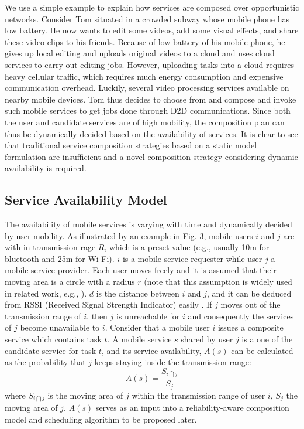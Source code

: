 \documentclass[journal]{IEEEtran}
\begin{document}
We use a simple example to explain how services are composed over opportunistic networks.
Consider Tom situated in a crowded subway whose mobile phone has low battery. 
He now wants to edit some videos, add some visual effects, and share these video clips to his friends.
Because of low battery of his mobile phone, he gives up local editing and uploads original videos to a cloud and uses cloud services to carry out editing jobs. However, uploading tasks into a cloud requires heavy cellular traffic, which requires much energy consumption and expensive communication overhead.
Luckily, several video processing services available on nearby mobile devices. Tom thus decides to choose from and compose and invoke such mobile services to get jobs done through D2D communications. 
Since both the user and candidate services are of high mobility, the composition plan can thus be dynamically decided based on the availability of services.  It is clear to see that traditional service composition strategies based on a static model formulation are insufficient and a novel composition strategy considering dynamic availability is required.

\subsection{Service Availability Model}

The availability of mobile services is varying with time and dynamically decided by user mobility. 
As illustrated by an example in Fig. 3, mobile users $i$ and $j$ are with in transmission rage $R$, which is a preset value (e.g., usually 10m for bluetooth and 25m for Wi-Fi). $i$ is a mobile service requester while user $j$ a mobile service provider. Each user moves freely and it is assumed that their moving area is a circle with a radius $r$ (note that this assumption is widely used in related work, e.g., \cite{Yang2010, Deng2017, wu2001personal}). $d$ is the distance between $i$ and $j$, and it can be deduced from RSSI (Received Signal Strength Indicator) easily \cite{benkic2008using}. If $j$ moves out of the transmission range of $i$, then $j$ is unreachable for $i$ and consequently the services of $j$ become unavailable to $i$.
Consider that a mobile user $i$ issues a composite service which contains task $t$. A mobile service $s$ shared by user $j$ is a one of the candidate service for task $t$, and its service availability, $A(s)$ can be calculated as the probability that $j$ keeps staying inside the transmission range:
\begin{equation}
A(s) = \frac{S_{i \bigcap j}}{S_j}
\end{equation}
where $S_{i \bigcap j}$ is the moving area of $j$ within the transmission range of user $i$, $S_j$ the moving area of $j$. $A(s)$ serves as an input into a reliability-aware composition model and scheduling algorithm to be proposed later.
\end{document}
